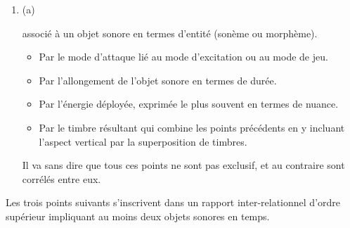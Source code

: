 \documentclass{article}
\newcommand{\myuline}[1]{%
  \uline{\phantom{#1}}%
  \llap{\contour{white}{#1}}%
}
\begin{document}


\begin{enumerate}
\item (a) \myuline{Accent} 

associé à un objet sonore en termes d’entité (sonème ou morphème).

\begin{itemize}
\item Par le mode d’attaque lié au mode d’excitation ou au mode de jeu.
\item Par l'allongement de l'objet sonore en termes de durée.
\item Par l’énergie déployée, exprimée le plus souvent en termes de nuance. 
\item Par le timbre résultant qui combine les points précédents en y incluant l'aspect vertical par la superposition de timbres.
\end{itemize}
Il va sans dire que tous ces points ne sont pas exclusif, et au contraire sont corrélés entre eux.
 \end{enumerate}
Les trois points suivants s’inscrivent dans un rapport inter-relationnel d’ordre supérieur impliquant au moins deux objets sonores en temps.
\end{document}
